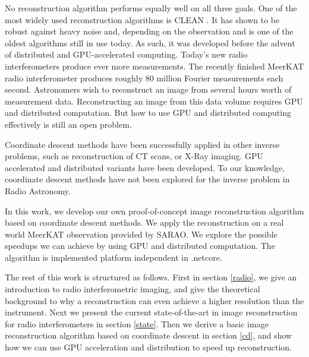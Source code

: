 No reconstruction algorithm performs equally well on all three goals. One of the most widely used reconstruction algorithms is CLEAN \cite{hogbom1974aperture, rau2011multi}. It has shown to be robust against heavy noise\cite{offringa2017optimized} and, depending on the observation and is one of the oldest algorithms still in use today. As such, it was developed before the advent of distributed and GPU-accelerated computing. Today's new radio interferometers produce ever more measurements. The recently finished MeerKAT radio interferometer produces roughly 80 million Fourier measurements each second. Astronomers wish to reconstruct an image from several hours worth of measurement data. Reconstructing an image from this data volume requires GPU and distributed computation. But how to use GPU and distributed computing effectively is still an open problem.

Coordinate descent methods have been successfully applied in other inverse problems, such as reconstruction of CT scans\cite{bouman1996unified}, or X-Ray imaging\cite{felix2017compressed}. GPU accelerated\cite{mcgaffin2015edge} and distributed\cite{fercoq2014fast} variants have been developed. To our knowledge, coordinate descent methods have not been explored for the inverse problem in Radio Astronomy.

In this work, we develop our own proof-of-concept image reconstruction algorithm based on coordinate descent methods. We apply the reconstruction on a real world MeerKAT observation provided by SARAO. We explore the possible speedups we can achieve by using GPU and distributed computation. The algorithm is implemented platform independent in .netcore.


The rest of this work is structured as follows. First in section \ref{radio}, we give an introduction to radio interferometric imaging, and give the theoretical background to why a reconstruction can even achieve a higher resolution than the instrument. Next we present the current state-of-the-art in image reconstruction for radio interferometers in section \ref{state}. Then we derive a basic image reconstruction algorithm based on coordinate descent in section \ref{cd}, and show how we can use GPU acceleration and distribution to speed up reconstruction.

